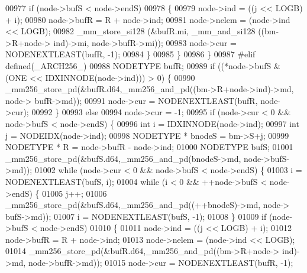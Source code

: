 \begin{DoxyCode}
00977                         \textcolor{keywordflow}{if} (node->bufS < node->endS)
00978                         \{
00979                                 node->ind = ((j << LOGB) + i);
00980                                 node->bufR = R + node->ind;
00981                                 node->nelem = (node->ind << LOGB);
00982                             \_mm\_store\_si128 (&bufR.mi, \_mm\_and\_si128 ((bm->R+node->
      ind)->mi, node->bufR->mi));
00983                                 node->cur = NODENEXTLEAST(bufR, -1);
00984                         \}
00985                 \}
00986         \}
00987 \textcolor{preprocessor}{#elif defined(\_ARCH256\_)}
00988         NODETYPE bufR;
00989         \textcolor{keywordflow}{if} ((*node->bufS & (ONE << IDXINNODE(node->ind))) > 0) \{
00990                 \_mm256\_store\_pd(&bufR.d64,\_mm256\_and\_pd((bm->R+node->ind)->md, node->
      bufR->md));
00991                 node->cur = NODENEXTLEAST(bufR, node->cur);
00992         \}
00993         \textcolor{keywordflow}{else}
00994                 node->cur = -1;
00995         \textcolor{keywordflow}{if} (node->cur < 0 && node->bufS < node->endS) \{
00996                 \textcolor{keywordtype}{int} i = IDXINNODE(node->ind);
00997                 \textcolor{keywordtype}{int} j = NODEIDX(node->ind);
00998                 NODETYPE * bnodeS = bm->S+j;
00999                 NODETYPE * R = node->bufR - node->ind;
01000                 NODETYPE bufS;
01001             \_mm256\_store\_pd(&bufS.d64,\_mm256\_and\_pd(bnodeS->md, node->bufS->md));
01002                 \textcolor{keywordflow}{while} (node->cur < 0 && node->bufS < node->endS) \{
01003                         i = NODENEXTLEAST(bufS, i);
01004                         \textcolor{keywordflow}{while} (i < 0 && ++node->bufS < node->endS) \{
01005                                 j++;
01006                             \_mm256\_store\_pd(&bufS.d64,\_mm256\_and\_pd((++bnodeS)->md, node->
      bufS->md));
01007                                 i = NODENEXTLEAST(bufS, -1);
01008                         \}
01009                         \textcolor{keywordflow}{if} (node->bufS < node->endS)
01010                         \{
01011                                 node->ind = ((j << LOGB) + i);
01012                                 node->bufR = R + node->ind;
01013                                 node->nelem = (node->ind << LOGB);
01014                             \_mm256\_store\_pd(&bufR.d64,\_mm256\_and\_pd((bm->R+node->
      ind)->md, node->bufR->md));
01015                                 node->cur = NODENEXTLEAST(bufR, -1);

\end{DoxyCode}
